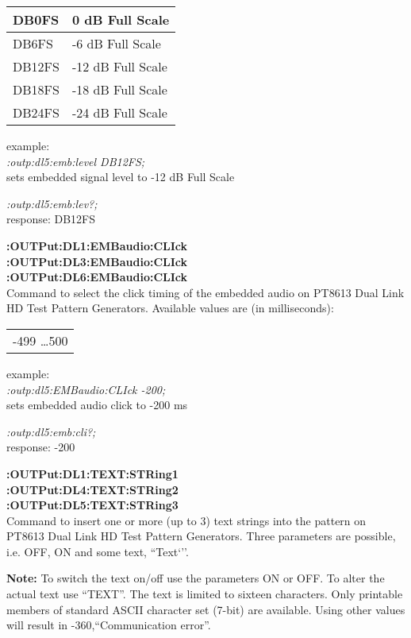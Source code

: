 \begin{tabular}{|l|l|}
\hline
DB0FS  &    0 dB Full Scale\\ \hline
DB6FS  &   -6 dB Full Scale\\ \hline
DB12FS &  -12 dB Full Scale \\ \hline
DB18FS &  -18 dB Full Scale \\ \hline
DB24FS &  -24 dB Full Scale \\ \hline
\end{tabular}

example:\\
\textit{:outp:dl5:emb:level DB12FS;}\\
sets embedded signal level to -12 dB Full Scale

\textit{:outp:dl5:emb:lev?;}\\
response: DB12FS

\textbf{:OUTPut:DL1:EMBaudio:CLIck}\\
\textbf{:OUTPut:DL3:EMBaudio:CLIck}\\
\textbf{:OUTPut:DL6:EMBaudio:CLIck}\\
Command to select the click timing of the embedded audio on PT8613 Dual Link HD Test Pattern Generators.  Available values are (in milliseconds):

\begin{tabular}{l}
-499 \ldots 500\\
\end{tabular}

example:\\
\textit{:outp:dl5:EMBaudio:CLIck -200;}\\
sets embedded audio click to -200 ms

\textit{:outp:dl5:emb:cli?;}\\
response: -200

\textbf{:OUTPut:DL1:TEXT:STRing1}\\
\textbf{:OUTPut:DL4:TEXT:STRing2}\\
\textbf{:OUTPut:DL5:TEXT:STRing3}\\
Command to insert one or more (up to 3) text strings into the pattern on PT8613 Dual Link HD Test Pattern Generators.
Three parameters are possible, i.e. OFF, ON and some text, ``Text`''.

\textbf{Note:} To switch the text on/off use the parameters ON or OFF. To alter the actual text use ``TEXT''.  The text is limited to sixteen characters.  Only printable members of standard ASCII character set (7-bit) are available.  Using other values will result in -360,``Communication error''.

